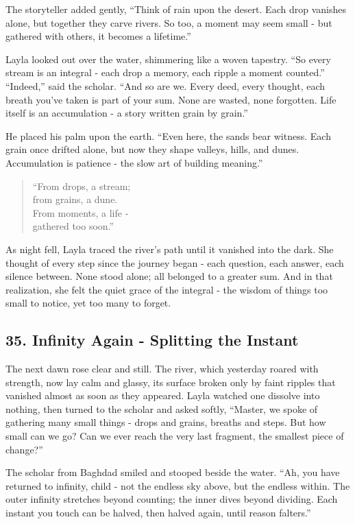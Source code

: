 \documentclass[
  letterpaper,
  DIV=11,
  numbers=noendperiod]{scrreprt}
\begin{document}
The storyteller added gently, ``Think of rain upon the desert. Each drop
vanishes alone, but together they carve rivers. So too, a moment may
seem small - but gathered with others, it becomes a lifetime.''

Layla looked out over the water, shimmering like a woven tapestry. ``So
every stream is an integral - each drop a memory, each ripple a moment
counted.'' ``Indeed,'' said the scholar. ``And so are we. Every deed,
every thought, each breath you've taken is part of your sum. None are
wasted, none forgotten. Life itself is an accumulation - a story written
grain by grain.''

He placed his palm upon the earth. ``Even here, the sands bear witness.
Each grain once drifted alone, but now they shape valleys, hills, and
dunes. Accumulation is patience - the slow art of building meaning.''

\begin{quote}
``From drops, a stream;\\
from grains, a dune.\\
From moments, a life -\\
gathered too soon.''
\end{quote}

As night fell, Layla traced the river's path until it vanished into the
dark. She thought of every step since the journey began - each question,
each answer, each silence between. None stood alone; all belonged to a
greater sum. And in that realization, she felt the quiet grace of the
integral - the wisdom of things too small to notice, yet too many to
forget.

\subsection{35. Infinity Again - Splitting the
Instant}\label{infinity-again---splitting-the-instant}

The next dawn rose clear and still. The river, which yesterday roared
with strength, now lay calm and glassy, its surface broken only by faint
ripples that vanished almost as soon as they appeared. Layla watched one
dissolve into nothing, then turned to the scholar and asked softly,
``Master, we spoke of gathering many small things - drops and grains,
breaths and steps. But how small can we go? Can we ever reach the very
last fragment, the smallest piece of change?''

The scholar from Baghdad smiled and stooped beside the water. ``Ah, you
have returned to infinity, child - not the endless sky above, but the
endless within. The outer infinity stretches beyond counting; the inner
dives beyond dividing. Each instant you touch can be halved, then halved
again, until reason falters.''
\end{document}

